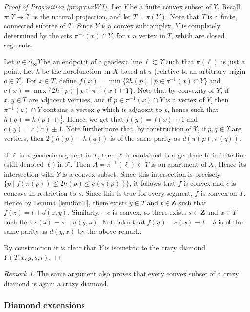 \documentclass[a4paper, 11pt]{article}
\theoremstyle{plain}
\theoremstyle{definition}
\theoremstyle{remark}
\newtheorem{remark}[proposition]{Remark}
\newcommand{\ZZ}{\mathbf{Z}}                          %
\begin{document}
\begin{proof}[Proof of Proposition \ref{prop:cvxWT}]
Let $Y$ be a finite convex subset of $\Upsilon$. Recall $\pi:\Upsilon\to \mathcal T$ is the natural projection, and let $T=\pi(Y)$. Note that $T$ is a finite, connected subtree of $\mathcal T$. Since $Y$ is a convex subcomplex, $Y$ is completely determined by the sets $\pi^{-1}(x)\cap Y$, for $x$ a vertex in  $T$, which are closed segments.  

Let $u\in \partial_\infty\Upsilon$ be an endpoint of a geodesic line $\ell\subset\Upsilon$ such that $\pi(\ell)$ is just a point.
Let $h$ be the horofunction on $X$ based at $u$ (relative to an arbitrary origin $o\in \Upsilon$). For $x\in T$, define $f(x)=\min \{ 2h(p)\mid p\in \pi^{-1}(x)\cap Y\}$ and $c(x)=\max \{ 2h(p)\mid p\in \pi^{-1}(x)\cap Y\}$. Note that by convexity of $Y$, if $x,y\in T$ are adjacent vertices, and if $p\in \pi^{-1}(x)\cap Y$ is a vertex of $Y$, then $\pi^{-1}(y)\cap Y$ contains a vertex $q$ which is adjacent to $p$, hence such that $h(q)=h(p)\pm \frac 12$. Hence, we get that $f(y)=f(x)\pm 1$ and $c(y)=c(x)\pm 1$. Note furthermore that, by construction of $\Upsilon$, if $p,q\in \Upsilon$ are vertices, then $2(h(p)-h(q))$ is of the same parity as $d(\pi(p),\pi(q))$. 


If $\ell$ is a geodesic segment in $T$, then $\ell$ is contained in a geodesic bi-infinite line (still denoted $\ell$) in $\mathscr T$. Then $A=\pi^{-1}(\ell)\subset \Upsilon$ is an apartment of $X$. Hence its intersection with $Y$ is a convex subset. Since this intersection is precisely $\{p \mid f(\pi(p))\leq 2h(p)\leq c(\pi(p))\}$, it follows that $f$ is convex and $c$ is concave in restriction to $s$. Since this is true for every segment, $f$ is convex on $T$. Hence by Lemma \ref{lem:fonT}, there exists $y\in T$ and $t\in \ZZ$ such that $f(z)=t+d(z,y)$. Similarly, $-c$ is convex, so there exists $s\in \ZZ$ and $x\in T$ such that $c(z)=s-d(y,z)$. Note also that $f(y)-c(x)=t-s$ is of the same parity as $d(y,x)$ by the above remark.

 By construction it is clear that $Y$ is isometric to the crazy diamond $Y(T,x,y,s,t)$.
\end{proof}

\begin{remark}
The same argument also proves that every convex subset of a crazy diamond is again a crazy diamond.
\end{remark}


\subsubsection{Diamond extensions}
\end{document}
